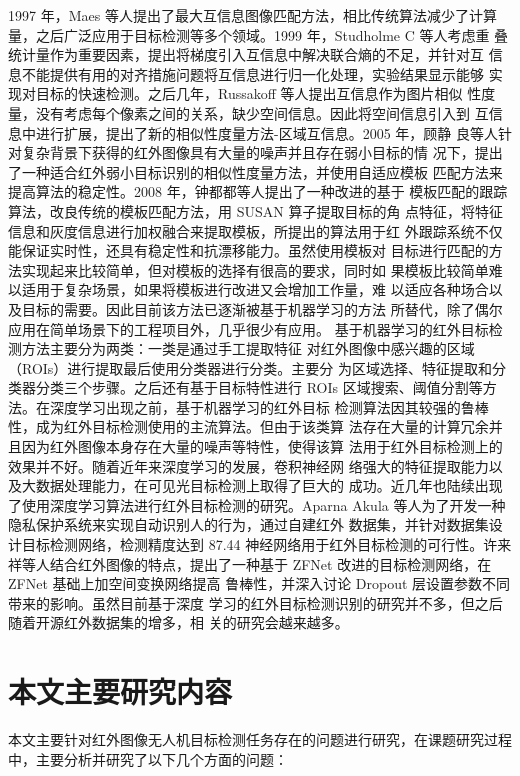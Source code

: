 1997 年，Maes 等人提出了最大互信息图像匹配方法，相比传统算法减少了计算
量，之后广泛应用于目标检测等多个领域\cite{maes1997multimodality}。1999 年，Studholme C 等人考虑重
叠统计量作为重要因素，提出将梯度引入互信息中解决联合熵的不足，并针对互
信息不能提供有用的对齐措施问题将互信息进行归一化处理，实验结果显示能够
实现对目标的快速检测\cite{studholme1999overlap}。之后几年，Russakoff 等人提出互信息作为图片相似
性度量，没有考虑每个像素之间的关系，缺少空间信息。因此将空间信息引入到
互信息中进行扩展，提出了新的相似性度量方法-区域互信息\cite{russakoff2004image}。2005 年，顾静
良等人针对复杂背景下获得的红外图像具有大量的噪声并且存在弱小目标的情
况下，提出了一种适合红外弱小目标识别的相似性度量方法，并使用自适应模板
匹配方法来提高算法的稳定性\cite{顾静良2005基于自适应模板匹配的红外弱小目标检测}。2008 年，钟都都等人提出了一种改进的基于
模板匹配的跟踪算法，改良传统的模板匹配方法，用 SUSAN 算子提取目标的角
点特征，将特征信息和灰度信息进行加权融合来提取模板，所提出的算法用于红
外跟踪系统不仅能保证实时性，还具有稳定性和抗漂移能力\cite{钟都都2008用于红外目标跟踪的模板匹配改进算法}。虽然使用模板对
目标进行匹配的方法实现起来比较简单，但对模板的选择有很高的要求，同时如
果模板比较简单难以适用于复杂场景，如果将模板进行改进又会增加工作量，难
以适应各种场合以及目标的需要。因此目前该方法已逐渐被基于机器学习的方法
所替代，除了偶尔应用在简单场景下的工程项目外，几乎很少有应用。
基于机器学习的红外目标检测方法主要分为两类：一类是通过手工提取特征
对红外图像中感兴趣的区域（ROIs）进行提取最后使用分类器进行分类。主要分
为区域选择、特征提取和分类器分类三个步骤。之后还有基于目标特性进行 ROIs
区域搜索、阈值分割等方法。在深度学习出现之前，基于机器学习的红外目标
检测算法因其较强的鲁棒性，成为红外目标检测使用的主流算法。但由于该类算
法存在大量的计算冗余并且因为红外图像本身存在大量的噪声等特性，使得该算
法用于红外目标检测上的效果并不好。随着近年来深度学习的发展，卷积神经网
络强大的特征提取能力以及大数据处理能力，在可见光目标检测上取得了巨大的
成功。近几年也陆续出现了使用深度学习算法进行红外目标检测的研究。Aparna
Akula 等人为了开发一种隐私保护系统来实现自动识别人的行为，通过自建红外
数据集，并针对数据集设计目标检测网络，检测精度达到 87.44%
神经网络用于红外目标检测的可行性\cite{akula2018deep}。许来祥等人结合红外图像的特点，提出了一种基于 ZFNet 改进的目标检测网络，在 ZFNet 基础上加空间变换网络提高
鲁棒性，并深入讨论 Dropout 层设置参数不同带来的影响\cite{许来祥2020基于改进}。虽然目前基于深度
学习的红外目标检测识别的研究并不多，但之后随着开源红外数据集的增多，相
关的研究会越来越多。

\section{本文主要研究内容}
本文主要针对红外图像无人机目标检测任务存在的问题进行研究，在课题研究过程中，主要分析并研究了以下几个方面的问题：

